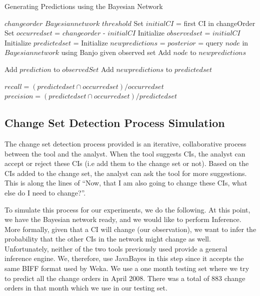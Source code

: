 \documentclass{article}
\begin{document}
\begin{algorithm}[tb]
   \caption{Generating Predictions using the Bayesian Network}
   \label{alg:simulation}
\begin{algorithmic}
    $change order$
     $Bayesian network$
     $threshold$
    \STATE Set $initial CI$ = first CI in changeOrder
    \STATE Set $occurred set$ = $change order$ - $initial CI$
    \STATE Initialize $observed set$ = {$initial CI$}
    \STATE Initialize $predicted set$ = {}
   \REPEAT  
    \STATE Initialize $new predictions$ = {}
    \STATE $posterior$ = query $node$ in $Bayesian network$ using Banjo given observed set
      \STATE Add $node$ to $new predictions$   
    \ENDIF
    \ENDFOR

      \STATE Add $prediction$ to $observedSet$
    \ENDIF
    \ENDFOR
\STATE Add $new predictions$ to $predicted set$

\STATE $recall = (predicted set \cap occurred set)/occurred set$
\STATE $precision = (predicted set \cap occurred set)/predicted set$
\end{algorithmic}
\end{algorithm}

\subsection{Change Set Detection Process Simulation}

The change set detection process provided is an iterative, collaborative process between the tool and the analyst. When the tool suggests CIs, the analyst can
accept or reject these CIs (i.e add them to the change set or not). Based on the CIs added to the change set, the analyst can ask the tool for more
suggestions. This is along the lines of ``Now, that I am also going to change these CIs, what else do I need to change?''.

To simulate this process for our experiments, we do the following. At this point, we have the Bayesian network ready, and we would like to perform Inference.
More formally, given that a CI will change (our observation), we want to infer the probability that the other CIs in the network might change as well.
Unfortunately, neither of the two tools previously used provide a general inference engine. We, therefore, use JavaBayes in this step since it accepts
the same BIFF format used by Weka. We use a one month testing set where we try to predict all the change orders in April 2008. There was a total of
883 change orders in that month which we use in our testing set. 
\end{document}
